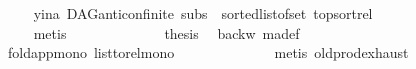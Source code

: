 \begin{isabellebody}
\ \ \ \ \ \ \ \ \ \ \ \ \isamarkupfalse%
\ y{\isacharunderscore}{\kern0pt}ina\ DAG{\isachardot}{\kern0pt}anticon{\isacharunderscore}{\kern0pt}finite\ subs\ {}{\isacharparenleft}{\kern0pt}{}{\isacharcomma}{\kern0pt}{}{\isacharparenright}{\kern0pt}\ sorted{\isacharunderscore}{\kern0pt}list{\isacharunderscore}{\kern0pt}of{\isacharunderscore}{\kern0pt}set{\isacharparenleft}{\kern0pt}{}{\isacharparenright}{\kern0pt}\ top{\isacharunderscore}{\kern0pt}sort{\isacharunderscore}{\kern0pt}rel\isanewline
\ \ \ \ \ \ \ \ \ \ \ \ \isamarkupfalse%
\ metis\isanewline
\ \ \ \ \ \ \ \ \ \ \isamarkupfalse%
\ \isamarkupfalse%
\ {\isacharquery}{\kern0pt}thesis\ \isamarkupfalse%
\ backw\ ma{\isacharunderscore}{\kern0pt}def\ \ \isamarkupfalse%
\isanewline
\ \ \ \ \ \ \ \ \ \ fold{\isacharunderscore}{\kern0pt}app{\isacharunderscore}{\kern0pt}mono\ list{\isacharunderscore}{\kern0pt}to{\isacharunderscore}{\kern0pt}rel{\isacharunderscore}{\kern0pt}mono{}\isanewline
\ \ \ \ \ \ \ \ \ \ \ \ \isamarkupfalse%
\ {\isacharparenleft}{\kern0pt}metis\ old{\isachardot}{\kern0pt}prod{\isachardot}{\kern0pt}exhaust{\isacharparenright}{\kern0pt}\isanewline
\ \ \ \ \ \ \ \ \isamarkupfalse%
\isanewline
\ \ \ \ \ \ \isamarkupfalse%
\isanewline
\ \ \ \ \isamarkupfalse%
\isanewline
\ \ \isamarkupfalse%
%
\endisatagproof
{\isafoldproof}%
%
\isadelimproof
\isanewline
%
\endisadelimproof
%
\isadelimtheory
\isanewline
%
\endisadelimtheory
%
\isatagtheory
{}\isamarkupfalse%
%
\endisatagtheory
{\isafoldtheory}%
%
\isadelimtheory
%
\endisadelimtheory
%
\end{isabellebody}%
\endinput
